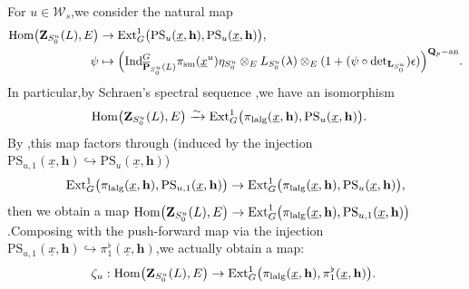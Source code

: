 \documentclass[10pt]{article}
\newcommand{\ind}{{\rm Ind}}
\newcommand{\homo}{{\rm Hom}}
\newcommand{\ext}{{\rm Ext}}
\newcommand{\ana}{{\rm an}}
\newcommand{\op}{{\overline{{\mathbf{P}}}}}
\newcommand{\sm}{{\rm sm}}
\newcommand{\lalg}{{\rm lalg}}
\newcommand{\bL}{{\mathbf{L}}}
\newcommand{\bQ}{{\mathbf{Q}}}
\newcommand{\bZ}{{\mathbf{Z}}}
\newcommand{\bh}{{\mathbf{h}}}
\newcommand{\sW}{\mathscr W}
\begin{document}
For $u\in \sW_s$,\;we consider the natural map
\begin{equation}
	\begin{aligned}
		\homo\big(\bZ_{S^u_0}(L),E\big)&\rightarrow\ext^1_{G}\big(\mathrm{PS}_{u}(\underline{x},\bh),\mathrm{PS}_{u}(\underline{x},\bh)\big),\;\\
		\psi&\mapsto \Big(\ind^G_{\op_{S^u_0}(L)}\pi_{\sm}(\underline{x}^u)\eta_{S^u_0}\otimes_EL_{S^u_0}(\lambda)\otimes_E(1+(\psi\circ\mathrm{det}_{\bL_{S_0^u}})\epsilon)\Big)^{\bQ_p-\ana}.
	\end{aligned}
\end{equation}
In particular,\;by Schraen's spectral sequence \cite[(4.37)]{schraen2011GL3},\;we have an isomorphism
\begin{equation}
	\begin{aligned}
		\homo\big(\bZ_{S^u_0}(L),E\big)&\xrightarrow{\sim}\ext^1_{G}\big(\pi_{\lalg}(\underline{x},\bh),\mathrm{PS}_{u}(\underline{x},\bh)\big).
	\end{aligned}
\end{equation}
By \cite[Lemma 2.26]{2019DINGSimple},\;this map factors through (induced by the injection $\mathrm{PS}_{u,1}(\underline{x},\bh)\hookrightarrow \mathrm{PS}_{u}(\underline{x},\bh)$)
\[\ext^1_{G}\big(\pi_{\lalg}(\underline{x},\bh),\mathrm{PS}_{u,1}(\underline{x},\bh)\big)\rightarrow \ext^1_{G}\big(\pi_{\lalg}(\underline{x},\bh),\mathrm{PS}_{u}(\underline{x},\bh)\big),\]
then we obtain a map $\homo\big(\bZ_{S^u_0}(L),E\big)\rightarrow\ext^1_{G}\big( \pi_{\lalg}(\underline{x},\bh),\mathrm{PS}_{u,1}(\underline{x},\bh)\big)$.\;Composing with the push-forward map via the injection $\mathrm{PS}_{u,1}(\underline{x},\bh)\hookrightarrow \pi^{\flat}_1(\underline{x},\bh)$,\;we actually obtain a map:
\[\zeta_{u}:\homo\big(\bZ_{S^u_0}(L),E\big)\rightarrow\ext^1_{G}\big(\pi_{\lalg}(\underline{x},\bh),\pi^{\flat}_1(\underline{x},\bh)\big).\;\]
\end{document}
